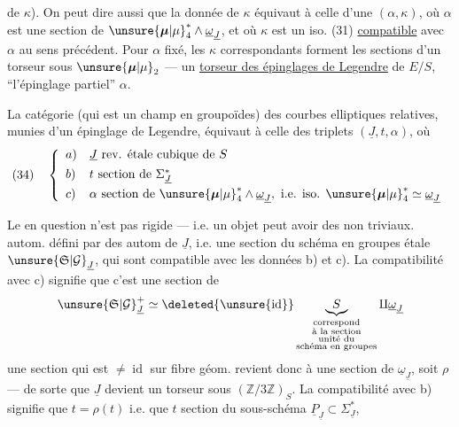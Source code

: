 
de $\kappa$). On peut dire aussi que la donnée de $\kappa$ équivaut à celle d'une  $(\alpha,\kappa)$, où $\alpha$ est une section de $\unsure{\boldsymbol{\mu}|\mu}_4^*\wedge\underline{\omega}_{\underline{J}}$, et où $\kappa$ est un iso. (31) \uline{compatible} avec $\alpha$ au sens précédent. Pour $\alpha$ fixé, les $\kappa$ correspondants forment les sections d'un torseur sous $\unsure{\boldsymbol{\mu}|\mu}_2$ --- un \uline{torseur des épinglages de Legendre} de $E/S$,  ``l'épinglage partiel'' $\alpha$.

La catégorie (qui est un champ en groupoïdes) des courbes elliptiques relatives, munies d'un épinglage de Legendre, équivaut à celle des triplets $(\underline{J},t,\alpha)$, où
\[
(34)\quad\left\{\begin{array}{ll}
a)&\underline{J}\text{ rev. étale cubique de }S\\[4pt]
b)&t\text{ section de }\Sigma_{\underline{J}}^*\\[4pt]
c)&\alpha\text{ section de }\unsure{\boldsymbol{\mu}|\mu}_4^*\wedge\underline{\omega}_{\underline{J}},\ \text{i.e. iso. }\unsure{\boldsymbol{\mu}|\mu}_4^*\simeq\underline{\omega}_{\underline{J}}
\end{array}\right.
\]



Le  en question n'est pas rigide --- i.e. un objet peut avoir des  non triviaux.  autom.  défini par des autom de $\underline{J}$, i.e. une section du schéma en groupes étale $\unsure{\mathfrak{S}|\mathcal G}_{\underline{J}}$, qui sont compatible avec les données b) et c). La compatibilité avec c) signifie que c'est une section de
\[
\unsure{\mathfrak{S}|\mathcal G}_{\underline{J}}^+\simeq\deleted{\unsure{\operatorname{id}}}\underbrace{S}_{\substack{\text{correspond}\\\text{à la section}\\\text{unité du}\\\text{schéma en groupes}}}\amalg\underline{\omega}_{\underline{J}}
\]
une section qui est $\ne\operatorname{id}$ sur  fibre géom. revient donc à une section de $\underline{\omega}_{\underline{J}}$, soit $\rho$ --- de sorte que $\underline{J}$ devient un torseur sous $(\mathbb{Z}/3\mathbb{Z})_S$. La compatibilité avec b) signifie que $t=\rho(t)$ i.e. que $t$  section du sous-schéma $\underline{P}_{\underline{J}}\subset\Sigma_{\underline{J}}^*$,

